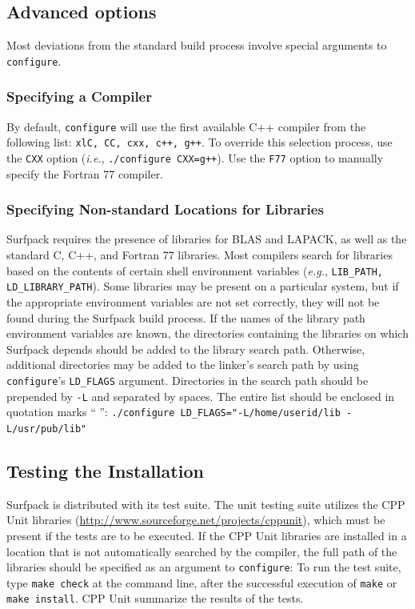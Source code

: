 \documentclass{article}
\begin{document}
\subsection{Advanced options}\label{sec:advancedinstall}
Most deviations from the standard build process involve special arguments to
\texttt{configure}.
\subsubsection{Specifying a Compiler}
By default, \texttt{configure} will use the first available C++ compiler from the
following list: \texttt{xlC, CC, cxx, c++, g++}.  To override this selection process, use
the \texttt{CXX} option ({\em i.e.}, \texttt{./configure CXX=g++}).  Use the \texttt{F77} option to manually specify the Fortran 77 compiler.

\subsubsection{Specifying Non-standard Locations for Libraries}
Surfpack requires the presence of libraries for BLAS and LAPACK, as well as the
standard C, C++, and Fortran 77 libraries.  Most compilers search for libraries
based on the contents of certain shell environment variables ({\em e.g.}, \texttt{LIB\_PATH,
LD\_LIBRARY\_PATH}).  Some libraries may be present on a particular system, but
if the appropriate environment variables are not set correctly, they will not be
found during the Surfpack build process.  If the names of the library path
environment variables are known, the directories containing the libraries on
which Surfpack depends should be added to the library search path.  Otherwise,
additional directories may be added to the linker's search path by using
\texttt{configure}'s \texttt{LD\_FLAGS} argument.  Directories in the search path should be
prepended by \texttt{-L} and separated by spaces.  The entire list should be enclosed
in quotation marks `` '': 
\texttt{./configure LD\_FLAGS="-L/home/userid/lib -L/usr/pub/lib"}

\subsection{Testing the Installation}
Surfpack is distributed with its test suite.  The unit testing suite utilizes
the CPP Unit libraries (\url{http://www.sourceforge.net/projects/cppunit}), which must be present if the tests are to be executed.  If the CPP Unit libraries are
installed in a location that is not automatically searched by the compiler, the
full path of the libraries should be specified as an argument to \texttt{configure}:
To run the test suite, type \texttt{make check} at the command line, after the
successful execution of \texttt{make} or \texttt{make install}.  CPP Unit
summarize the results of the tests.
\end{document}
